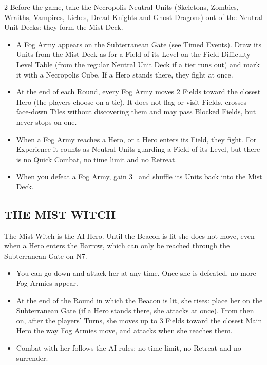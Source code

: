 \begin{multicols*}{2}
Before the game, take the Necropolis Neutral Units (Skeletons, Zombies, Wraiths, Vampires, Liches, Dread Knights and Ghost Dragons) out of the Neutral Unit Decks: they form the Mist Deck.
\begin{itemize}
  \item A Fog Army appears on the Subterranean Gate (see Timed Events). Draw its Units from the Mist Deck as for a Field of its Level on the Field Difficulty Level Table (from the regular Neutral Unit Deck if a tier runs out) and mark it with a Necropolis Cube. If a Hero stands there, they fight at once.
  \item At the end of each Round, every Fog Army moves 2 Fields toward the closest Hero (the players choose on a tie). It does not flag or visit Fields, crosses face-down Tiles without discovering them and may pass Blocked Fields, but never stops on one.
  \item When a Fog Army reaches a Hero, or a Hero enters its Field, they fight. For Experience it counts as Neutral Units guarding a Field of its Level, but there is no Quick Combat, no time limit and no Retreat.
  \item When you defeat a Fog Army, gain 3~ and shuffle its Units back into the Mist Deck.
\end{itemize}

\subsection*{\MakeUppercase{The Mist Witch}}

The Mist Witch is the AI Hero. Until the Beacon is lit she does not move, even when a Hero enters the Barrow, which can only be reached through the Subterranean Gate on N7.
\begin{itemize}
  \item You can go down and attack her at any time. Once she is defeated, no more Fog Armies appear.
  \item At the end of the Round in which the Beacon is lit, she rises: place her on the Subterranean Gate (if a Hero stands there, she attacks at once). From then on, after the players' Turns, she moves up to 3 Fields toward the closest Main Hero the way Fog Armies move, and attacks when she reaches them.
  \item Combat with her follows the AI rules: no time limit, no Retreat and no surrender.
\end{itemize}

\end{multicols*}

